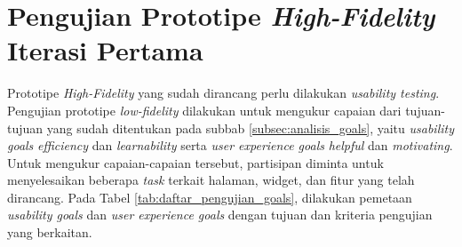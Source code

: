 \section{Pengujian Prototipe \textit{High-Fidelity} Iterasi Pertama}
\label{sec:test_1}

Prototipe \textit{High-Fidelity} yang sudah dirancang perlu dilakukan \textit{usability testing}. Pengujian prototipe \textit{low-fidelity} dilakukan untuk mengukur capaian dari tujuan-tujuan yang sudah ditentukan pada subbab \ref{subsec:analisis_goals}, yaitu \textit{usability goals} \textit{efficiency} dan \textit{learnability} serta \textit{user experience goals} \textit{helpful} dan \textit{motivating}. Untuk mengukur capaian-capaian tersebut, partisipan diminta untuk menyelesaikan beberapa \textit{task} terkait halaman, widget, dan fitur yang telah dirancang. Pada Tabel \ref{tab:daftar_pengujian_goals}, dilakukan pemetaan \textit{usability goals} dan \textit{user experience goals} dengan tujuan dan kriteria pengujian yang berkaitan.

